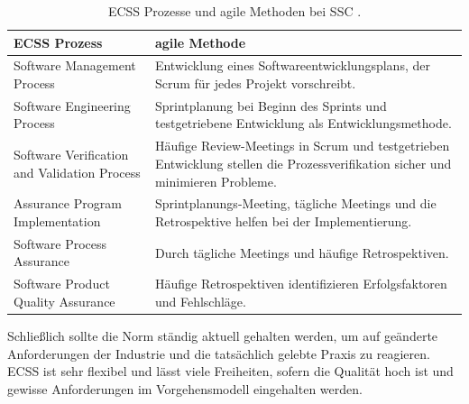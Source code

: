 \begin{table}[h]
\center
\caption{ECSS Prozesse und agile Methoden bei SSC \parencite[in Anlehnung an][S. 5]{Ahmad:2010:ESC:1890810.1890816}.}
\label{tab:ecss_mapping}
\begin{tabularx}{\textwidth}{p{6cm}|X}
ECSS Prozess & agile Methode\\
\hline
\hline
Software Management Process & Entwicklung eines Softwareentwicklungsplans, der Scrum für jedes Projekt vorschreibt.\\
\hline
Software Engineering Process & Sprintplanung bei Beginn des Sprints und testgetriebene Entwicklung als Entwicklungsmethode.\\
\hline
Software Verification and Validation Process & Häufige Review-Meetings in Scrum und testgetrieben Entwicklung stellen die Prozessverifikation sicher und minimieren Probleme.\\
\hline
Assurance Program Implementation & Sprintplanungs-Meeting, tägliche Meetings und die Retrospektive helfen bei der Implementierung.\\
\hline
Software Process Assurance & Durch tägliche Meetings und häufige Retrospektiven.\\
\hline
Software Product Quality Assurance & Häufige Retrospektiven identifizieren Erfolgsfaktoren und Fehlschläge.\\
\end{tabularx}
\end{table}

Schließlich sollte die Norm ständig aktuell gehalten werden, um auf geänderte Anforderungen der Industrie und die tatsächlich gelebte Praxis zu reagieren.
ECSS ist sehr flexibel und lässt viele Freiheiten, sofern die Qualität hoch ist und gewisse Anforderungen im Vorgehensmodell eingehalten werden.
\parencite[Vgl.][S. 6]{Ahmad:2010:ESC:1890810.1890816}




























